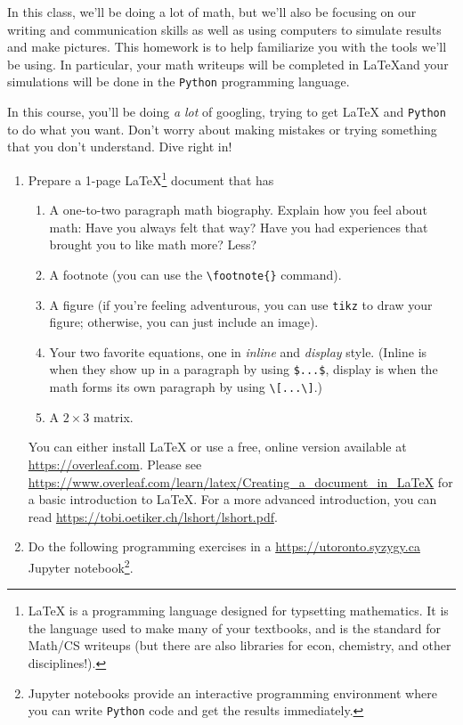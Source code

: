 \documentclass[letter]{article}
\newcommand{\setheader}[6]{
	\lhead{{\sc #1}\\{\sc #2} ({\small \it \today})}
	\rhead{
		{\bf #3} 
		\ifthenelse{\equal{#4}{}}{}{(#4)}\\
		{\bf #5} 
		\ifthenelse{\equal{#6}{}}{}{(#6)}%
	}
}
\begin{document}
	\setheader{MAT335}{Homework 0}{Due: 11:59pm January 12}{}{}{}
	In this class, we'll be doing a lot of math, but we'll also be 
	focusing on our writing and communication skills as well as using computers
	to simulate results and make pictures.  This homework is to help familiarize 
	you with the tools we'll be using. In particular, your math writeups will
	be completed in \LaTeX and your simulations will be done in the {\tt Python}
	programming language.

	In this course, you'll be doing \emph{ a lot} of googling, trying to get \LaTeX{} and
	{\tt Python} to do what you want. Don't worry about making mistakes or trying something
	that you don't understand. Dive right in!

	\begin{enumerate}
		\item Prepare a 1-page \LaTeX{}\footnote{ \LaTeX{} is a programming language designed for typsetting
			mathematics. It is the language used to make many of your textbooks, and is the standard for
			Math/CS writeups (but there are also libraries for econ, chemistry, and other disciplines!).} document that has
		\begin{enumerate}
			\item A one-to-two paragraph math biography. Explain how you feel about math: Have you always felt that way?
				Have you had experiences that brought you to like math more? Less?
			\item A footnote (you can use the \verb|\footnote{}| command).
			\item A figure (if you're feeling adventurous, you can use {\tt tikz} to draw your figure; otherwise,
				you can just include an image).
			\item Your two favorite equations, one in \emph{inline} and \emph{display} style. (Inline is when
				they show up in a paragraph by using \verb|$...$|, display is when the math forms
				its own paragraph by using \verb|\[...\]|.)
			\item A $2\times 3$ matrix.
		\end{enumerate}

		You can either install \LaTeX{} or use a free, online version available at \url{https://overleaf.com}. Please
		see \url{https://www.overleaf.com/learn/latex/Creating_a_document_in_LaTeX} for a basic introduction to \LaTeX{}.
		For a more advanced introduction, you can read \url{https://tobi.oetiker.ch/lshort/lshort.pdf}.



		\item Do the following programming exercises in a \url{https://utoronto.syzygy.ca} Jupyter notebook\footnote{ Jupyter
			notebooks provide an interactive programming environment where you can write {\tt Python} code and get 
			the results immediately.}.


\end{enumerate}
\end{document}
